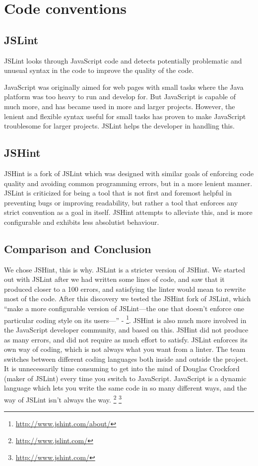 \section{Code conventions}
\subsection*{JSLint}
JSLint looks through JavaScript code and detects potentially problematic and unusual syntax in the code to improve the quality of the code. 

JavaScript was originally aimed for web pages with small tasks where the Java platform was too heavy to run and develop for. But JavaScript is capable of much more, and has became used in more and larger projects. However, the lenient and flexible syntax useful for small tasks has proven to make JavaScript troublesome for larger projects. JSLint helps the developer in handling this. \cite{jslint-about}

\subsection*{JSHint}
JSHint is a fork of JSLint which was designed with similar goals of enforcing code quality and avoiding common programming errors, but in a more lenient manner. JSLint is criticized for being a tool that is not first and foremost helpful in preventing bugs or improving readability, but rather a tool that enforces any strict convention as a goal in itself. JSHint attempts to alleviate this, and is more configurable and exhibits less absolutist behaviour. \cite{jshint-about}

\subsection*{Comparison and Conclusion}
We chose JSHint, this is why.
JSLint is a stricter version of JSHint. We started out with JSLint after we had written some lines of code, and saw that it produced closer to a 100 errors, and satisfying the linter would mean to rewrite most of the code. After this discovery we tested the JSHint fork of JSLint, which  “make a more configurable version of JSLint—the one that doesn't enforce one particular coding style on its users—” - \footnote{\url{http://www.jshint.com/about/}}. JSHint is also much more involved in the JavaScript developer community, and based on this. JSHint did not produce as many errors, and did not require as much effort to satisfy.
JSLint enforces its own way of coding, which is not always what you want from a linter. The team switches between different coding languages both inside and outside the project. It is unnecessarily time consuming to get into the mind of Douglas Crockford (maker of JSLint) every time you switch to JavaScript. JavaScript is a dynamic language which lets you write the same code in so many different ways, and the way of JSLint isn’t always the way.
\footnote{\url{http://www.jslint.com/}}
\footnote{\url{http://www.jshint.com/}}

